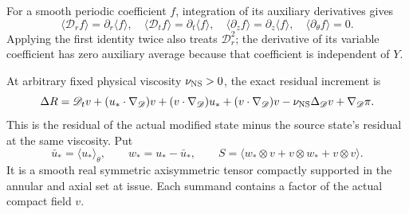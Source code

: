 For a smooth periodic coefficient $f$, integration of its auxiliary
derivatives gives
\begin{equation}\label{mcstress:average_derivatives}
 \langle\mathscr D_r f\rangle=\partial_r\langle f\rangle,
 \quad \langle\mathscr D_t f\rangle=\partial_t\langle f\rangle,
 \quad \langle\partial_z f\rangle=\partial_z\langle f\rangle,
 \quad \langle\partial_\theta f\rangle=0.
\end{equation}
Applying the first identity twice also treats $\mathscr D_r^2$;
the derivative of its variable coefficient has zero auxiliary average
because that coefficient is independent of $Y$.

At arbitrary fixed physical viscosity $\nu_{\rm NS}>0$, the exact
residual increment is
\begin{equation}\label{mcstress:residual_increment}
 \Delta R=\mathscr D_t v+(u_*\cdot\nabla_{\mathscr D})v
 +(v\cdot\nabla_{\mathscr D})u_*
 +(v\cdot\nabla_{\mathscr D})v
 -\nu_{\rm NS}\Delta_{\mathscr D}v+\nabla_{\mathscr D}\pi.
\end{equation}
This is the residual of the actual modified state minus the source
state's residual at the same viscosity. Put
\begin{equation}\label{mcstress:actual_tensor}
 \bar u_* =\langle u_*\rangle_\theta,\qquad
 w_*=u_*-\bar u_*,\qquad
 S=\langle w_*\otimes v+v\otimes w_*+v\otimes v\rangle.
\end{equation}
It is a smooth real symmetric axisymmetric tensor compactly supported
in the annular and axial set at issue. Each summand contains a factor
of the actual compact field $v$.

